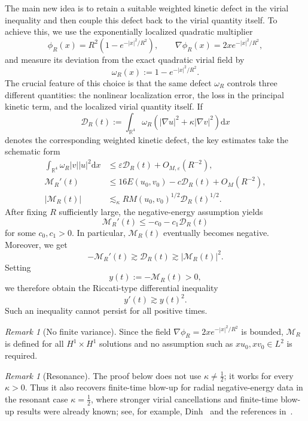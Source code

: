 \documentclass[12pt]{amsart}
\numberwithin{equation}{section}
\theoremstyle{remark}
\newtheorem{remark}[theorem]{Remark}
\newcommand{\dd}{\mathrm{d}x}
\begin{document}
The main new idea is to retain a suitable weighted kinetic defect in the virial inequality and then couple this defect back to the virial quantity itself. To achieve this, we use the exponentially localized quadratic multiplier
\begin{equation*}
\phi_R(x) = R^2\left(1-e^{-|x|^2/R^2}\right), \qquad \nabla\phi_R(x)= 2x e^{-|x|^2/R^2},
\end{equation*}
and measure its deviation from the exact quadratic virial field by
\begin{equation*}
\omega_R(x) := 1-e^{-|x|^2/R^2}.
\end{equation*}
The crucial feature of this choice is that the same defect $\omega_R$ controls three different quantities: the nonlinear localization error, the loss in the principal kinetic term, and the localized virial quantity itself. If 
\[
\mathcal D_R(t):=\int_{\mathbb R^4}\omega_R\left(|\nabla u|^2+\kappa|\nabla v|^2\right)\dd
\] 
denotes the corresponding weighted kinetic defect, the key estimates take the schematic form
\begin{align*}
\int_{\mathbb R^4}\omega_R|v||u|^2\dd &\le \varepsilon \mathcal D_R(t) +O_{M,\varepsilon}(R^{-2}),\\
\mathcal M_R'(t) &\le 16E(u_0,v_0)-c\mathcal D_R(t)+O_M(R^{-2}),\\
|\mathcal M_R(t)| &\lesssim_\kappa R M(u_0,v_0)^{1/2}\mathcal D_R(t)^{1/2}.
\end{align*}
After fixing $R$ sufficiently large, the negative-energy assumption yields
\[
\mathcal M_R'(t) \le -c_0-c_1\mathcal D_R(t)
\]
for some $c_0,c_1>0$. In particular, $\mathcal M_R(t)$ eventually becomes negative. Moreover, we get
\[ 
-\mathcal M_R'(t) \gtrsim  \mathcal D_R(t) \gtrsim  |\mathcal M_R(t)|^2.
\]
Setting
\[
 y(t):=-\mathcal M_R(t)>0,
\]
we therefore obtain the Riccati-type differential inequality
\[
 y'(t)\gtrsim y(t)^2.
\]
Such an inequality cannot persist for all positive times.

\begin{remark}[No finite variance]
Since the field $\nabla \phi_R=2xe^{-|x|^2/R^2}$ is bounded, $\mathcal M_R$ is defined for all $H^1\times H^1$ solutions and no assumption such as $xu_0,xv_0\in L^2$ is required. 
\end{remark}

\begin{remark}[Resonance]
The proof below does not use $\kappa\neq\frac12$; it works for every $\kappa>0$. Thus it also recovers finite-time blow-up for radial negative-energy data in the resonant case $\kappa=\frac12$, where stronger virial cancellations and finite-time blow-up results were already known; see, for example, Dinh~\cite{Dinh, Dinh-2} and the references in~\cite{DF}.
\end{remark}
\end{document}

